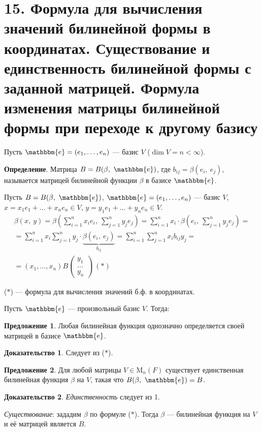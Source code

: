 \documentclass[a4paper, 12pt]{article}
\newcommand{\me}{\mathbbm{e}}
\begin{document}
\section*{15. Формула для вычисления значений билинейной формы в координатах. Существование и единственность билинейной формы с заданной матрицей. Формула изменения матрицы билинейной формы при переходе к другому базису}
Пусть $\me = (e_1, \ldots, e_n)$ --- базис $V$ ($\dim V = n < \infty$).

\textbf{Определение}. Матрица $B = B(\beta,\ \me)$, где $b_{ij} = \beta(e_i,\ e_j)$, называется матрицей билинейной функции $\beta$ в базисе $\me$.

Пусть $B = B(\beta,\ \me)$, $\me = (e_1, \ldots, e_n)$ --- базис $V$, $x = x_1e_1 + \ldots + x_ne_n \in V$, $y = y_1e_1 + \ldots + y_ne_n \in V$.
\vspace{-6mm}
\begin{gather*}
\beta(x,\ y) = \beta(\sum_{i = 1}^{n}x_ie_i,\ \sum_{j = 1}^{n}y_je_j) = \sum_{i = 1}^{n}x_i \cdot \beta(e_i,\ \sum_{j = 1}^{n}y_je_j) = \\
= \sum_{i = 1}^{n} x_i \sum_{j = 1}^{n} y_j \cdot \underbrace{\beta(e_i,\ e_j)}_{b_{ij}} = \sum_{i = 1}^{n}\sum_{j = 1}^{n}x_ib_{ij}y_j = \\
= (x_1, \ldots, x_n) B
\begin{pmatrix}
y_1 \\
\ldots \\
y_n
\end{pmatrix}\ (*)\
\end{gather*}

\vspace{-3mm}
($*$) --- формула для вычисления значений б.ф. в координатах.

\vspace{5mm}
Пусть $\me$ --- произвольный базис $V$. Тогда:

\textbf{Предложение 1}. Любая билинейная функция однозначно определяется своей матрицей в базисе $\me$.

\textbf{Доказательство 1}. Следует из ($*$).

\vspace{5mm}
\textbf{Предложение 2}. Для любой матрицы $V \in \text{M}_n(F)$ существует единственная билинейная функция $\beta$ на $V$, такая что $B(\beta,\ \me) = B$.

\textbf{Доказательство 2}. \textit{Единственность} следует из 1.

\textit{Существование}: зададим $\beta$ по формуле ($*$). Тогда $\beta$ --- билинейная функция на $V$ и её матрицей является $B$.
\end{document}
